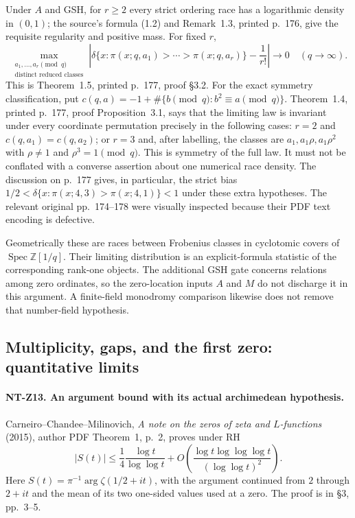 Under $A$ and GSH, for $r\ge2$ every strict ordering race has a
logarithmic density in $(0,1)$; the source's formula (1.2) and
Remark~1.3, printed p.~176, give the requisite regularity and positive
mass.  For fixed $r$,
\[
 \max_{\substack{a_1,\ldots,a_r\pmod q\\
                   \text{distinct reduced classes}}}
 \left|\delta\{x:\pi(x;q,a_1)>\cdots>\pi(x;q,a_r)\}
                   -\frac1{r!}\right|\longrightarrow0
       \quad(q\to\infty).
\tag{NT-R04}
\]
This is Theorem~1.5, printed p.~177, proof \S3.2.
For the exact symmetry classification, put
$c(q,a)=-1+\#\{b\pmod q:b^2\equiv a\pmod q\}$.
Theorem~1.4, printed p.~177, proof Proposition~3.1, says that the
limiting law is invariant under every coordinate permutation precisely
in the following cases: $r=2$ and $c(q,a_1)=c(q,a_2)$; or $r=3$
and, after labelling, the classes are
$a_1,a_1\rho,a_1\rho^2$ with $\rho\ne1$ and $\rho^3=1\pmod q$.
This is symmetry of the full law.  It must not be conflated with a
converse assertion about one numerical race density.  The discussion
on p.~177 gives, in particular, the strict bias
$1/2<\delta\{x:\pi(x;4,3)>\pi(x;4,1)\}<1$ under these extra
hypotheses.  The relevant original pp.~174--178 were visually inspected
because their PDF text encoding is defective.

Geometrically these are races between Frobenius classes in cyclotomic
covers of $\operatorname{Spec}\mathbb Z[1/q]$.  Their limiting
distribution is an explicit-formula statistic of the corresponding
rank-one objects.  The additional GSH gate concerns relations among
zero ordinates, so the zero-location inputs $A$ and $M$ do not discharge
it in this argument.  A finite-field monodromy comparison likewise
does not remove that number-field hypothesis.

\subsection{Multiplicity, gaps, and the first zero: quantitative limits}

\paragraph{NT-Z13. An argument bound with its actual archimedean hypothesis.}
Carneiro--Chandee--Milinovich, \emph{A note on the zeros of zeta and
$L$-functions} (2015), author PDF Theorem~1, p.~2, proves under RH
\[
 |S(t)|\le \frac14\frac{\log t}{\log\log t}
       +O\left(\frac{\log t\log\log\log t}{(\log\log t)^2}\right).
\tag{NT-Z13a}
\]
Here $S(t)=\pi^{-1}\arg\zeta(1/2+it)$, with the argument continued
from $2$ through $2+it$ and the mean of its two one-sided values used
at a zero.  The proof is in \S3, pp.~3--5.

